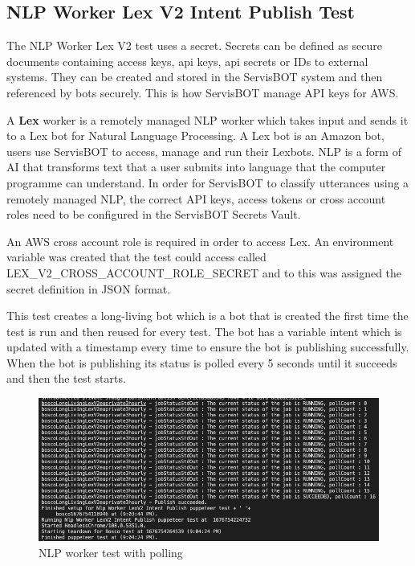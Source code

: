 \documentclass[12pt,a4paper,titlepage]{report}
\begin{document}
\subsection{NLP Worker Lex V2 Intent Publish Test}
The \ac{NLP} Worker Lex V2 test uses a secret. Secrets can be defined as secure documents containing access keys, api keys, api secrets or IDs to external systems. 
They can be created and stored in the ServisBOT system and then referenced by bots securely. 
This is how ServisBOT manage \ac{API} keys for AWS\@.

A \textbf{Lex} worker is a remotely managed NLP worker which takes input and sends it to a Lex bot for Natural Language Processing. 
A Lex bot is an Amazon bot, users use ServisBOT to access, manage and run their Lexbots. 
\ac{NLP} is a form of \ac{AI} that transforms text that a user submits into language that the computer programme can understand. 
In order for ServisBOT to classify utterances using a remotely managed NLP, the correct API keys, access tokens or cross account roles need to be configured in the ServisBOT Secrets Vault.

An AWS cross account role is required in order to access Lex. An environment variable was created that the test could access called LEX\_V2\_CROSS\_ACCOUNT\_ROLE\_SECRET and to this was assigned the secret definition in JSON format. 

This test creates a long-living bot which is a bot that is created the first time the test is run and then reused for every test. 
The bot has a variable intent which is updated with a timestamp every time to ensure the bot is publishing successfully. 
When the bot is publishing its status is polled every 5 seconds until it succeeds and then the test starts.

\begin{figure}[H]
 \centering
 \includegraphics[width=15cm]{./diagrams/nlp_worker_poll.png}
 \caption{NLP worker test with polling}
\end{figure}
\end{document}
